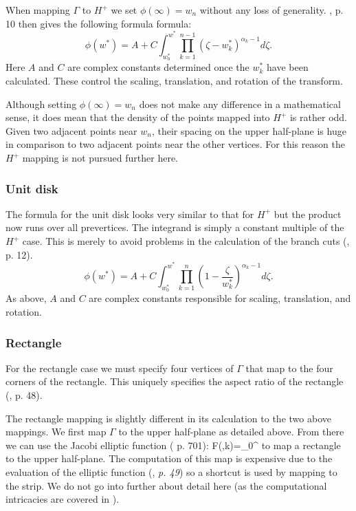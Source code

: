 When mapping $\Gamma$ to $H^+$ we set $\phi(\infty) = w_n$ without any loss of generality. \cite{driscoll}, p. 10 then gives the following formula formula:
\begin{equation}
\phi(w^*) = A + C \int^{w^*}_{w^*_0} \prod_{k=1}^{n-1} (\zeta-w^*_k)^{\alpha_k-1} d\zeta.
\end{equation}
Here $A$ and $C$ are complex constants determined once the $w^*_k$ have been calculated. These control the scaling, translation, and rotation of the transform.

Although setting $\phi(\infty) = w_n$ does not make any difference in a mathematical sense, it does mean that the density of the points mapped into $H^+$ is rather odd. Given two adjacent points near $w_n$, their spacing on the upper half-plane is huge in comparison to two adjacent points near the other vertices. For this reason the $H^+$ mapping is not pursued further here.

\subsubsection{Unit disk}

The formula for the unit disk looks very similar to that for $H^+$ but the product now runs over all prevertices. The integrand is simply a constant multiple of the $H^+$ case. This is merely to avoid problems in the calculation of the branch cuts (\cite{driscoll}, p. 12).
\begin{equation}
\label{unitscmap}
\phi(w^*) = A + C \int^{w^*}_{w^*_0} \prod_{k=1}^{n} (1 - \frac{\zeta}{w^*_k})^{\alpha_k-1} d\zeta.
\end{equation}
As above, $A$ and $C$ are complex constants responsible for scaling, translation, and rotation.

\subsubsection{Rectangle}
For the rectangle case we must specify four vertices of $\Gamma$ that map to the four corners of the rectangle. This uniquely specifies the aspect ratio of the rectangle (\cite{driscoll}, p. 48).

The rectangle mapping is slightly different in its calculation to the two above mappings. We first map $\Gamma$ to the upper half-plane as detailed above. From there we can use the Jacobi elliptic function (\cite{handbuch} p. 701):
\be
F(\gamma,k)=\int_0^\gamma {}
\ee
to map a rectangle to the upper half-plane. The computation of this map is expensive due to the evaluation of the elliptic function (\cite{driscoll}, \emph{p. 49}) so a shortcut is used by mapping to the strip. We do not go into further about detail here (as the computational intricacies are covered in \cite{howell90}).

